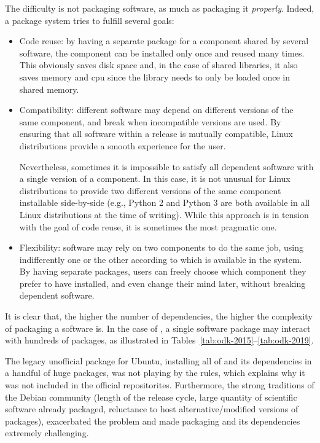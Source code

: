 \documentclass{deliverablereport}
\begin{document}
The difficulty is not packaging software, as much as packaging it
\emph{properly}. %
Indeed, a package system tries to fulfill several goals:
\begin{itemize}
\item Code reuse: by having a separate package for a component shared
  by several software, the component can be installed only once and
  reused many times. This obviously saves disk space and, in the case
  of shared libraries, it also saves memory and cpu since the library
  needs to only be loaded once in shared memory.

\item Compatibility: different software may depend on different
  versions of the same component, and break when incompatible versions
  are used. By ensuring that all software within a release is mutually
  compatible, Linux distributions provide a smooth experience for the
  user.

  Nevertheless, sometimes it is impossible to satisfy all dependent
  software with a single version of a component. In this case, it is
  not unusual for Linux distributions to provide two different
  versions of the same component installable side-by-side (e.g.,
  Python 2 and Python 3 are both available in all Linux distributions
  at the time of writing). While this approach is in tension with the
  goal of code reuse, it is sometimes the most pragmatic one.
  
\item Flexibility: software may rely on two components to do the
  same job, using indifferently one or the other according to which is
  available in the system. By having separate packages, users can
  freely choose which component they prefer to have installed, and even
  change their mind later, without breaking dependent software.
\end{itemize}

It is clear that, the higher the number of dependencies, the higher
the complexity of packaging a software is. %
In the case of \ODK, a single software package may interact with hundreds of
packages, as illustrated in
Tables~\ref{tab:odk-2015}--\ref{tab:odk-2019}. %

The legacy unofficial \Sage package for Ubuntu,
installing all of \Sage and its dependencies in a handful of huge
packages, was not playing by the rules, which explains why it was not
included in the official repositorites. %
Furthermore, the strong traditions of the Debian community (length of
the release cycle, large quantity of scientific software already
packaged, reluctance to host alternative/modified versions of
packages), exacerbated the problem and made packaging \Sage and its
dependencies extremely challenging.
\end{document}
